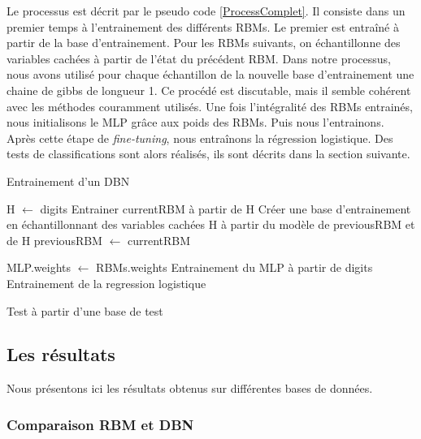 \documentclass[10pt,a4paper]{article}
\begin{document}
Le processus est décrit par le pseudo code \ref{ProcessComplet}. Il consiste dans un premier temps à l'entrainement des différents RBMs. Le premier est entraîné à partir de la base d'entrainement. Pour les RBMs suivants, on échantillonne des variables cachées à partir de l'état du précédent RBM. Dans notre processus, nous avons utilisé pour chaque échantillon de la nouvelle base d'entrainement une chaine de gibbs de longueur 1. Ce procédé est discutable, mais il semble cohérent avec les méthodes couramment utilisés. Une fois l'intégralité des RBMs entrainés, nous initialisons le MLP grâce aux poids des RBMs. Puis nous l'entrainons. Après cette étape de \textit{fine-tuning}, nous entraînons la régression logistique. Des tests de classifications sont alors réalisés, ils sont décrits dans la section suivante.


\begin{algorithm}[ht!]
	\caption{Entrainement d'un DBN}
	\label{ProcessComplet}
	\begin{algorithmic}
		\State H $\gets$ digits
				\State Entrainer currentRBM à partir de H
					\State Créer une base d'entrainement en échantillonnant des variables cachées H à partir du modèle de previousRBM et de H
				\EndIf
			\State previousRBM $\gets$ currentRBM
		\EndFor
		
		\State MLP.weights $\gets$ RBMs.weights
		\State Entrainement du MLP à partir de digits
		\State Entrainement de la regression logistique
		
		\State Test à partir d'une base de test
	\end{algorithmic}
\end{algorithm}


\subsection{Les résultats}


Nous présentons ici les résultats obtenus sur différentes bases de données. 


\subsubsection{Comparaison RBM et DBN}
\end{document}
